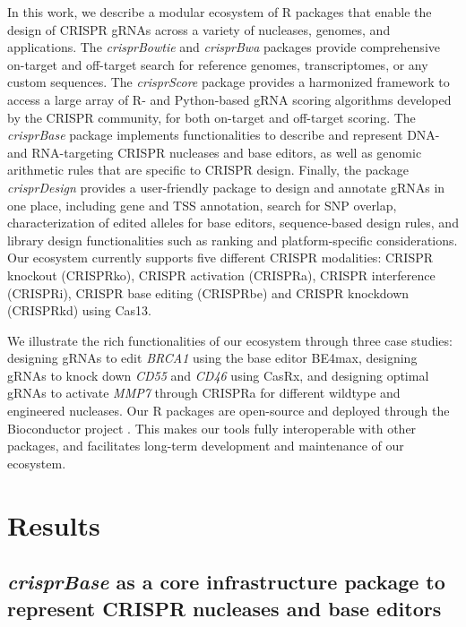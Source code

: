 \documentclass[pdftex,english,10pt]{article}
\begin{document}
In this work, we describe a modular ecosystem of R packages that enable the design of CRISPR gRNAs across a variety of nucleases, genomes, and applications.
The \textit{crisprBowtie} and \textit{crisprBwa} packages provide comprehensive on-target and off-target search for reference genomes, transcriptomes, or any custom sequences. The \textit{crisprScore} package provides a harmonized framework to access a large array of R- and Python-based gRNA scoring algorithms developed by the CRISPR community, for both on-target and off-target scoring. The \textit{crisprBase} package implements functionalities to describe and represent DNA- and RNA-targeting CRISPR  nucleases and base editors, as well as genomic arithmetic rules that are specific to CRISPR design. Finally, the package \textit{crisprDesign} provides a user-friendly package to design and annotate gRNAs in one place, including gene and TSS annotation, search for SNP overlap, characterization of edited alleles for base editors, sequence-based design rules, and library design functionalities such as ranking and platform-specific considerations. Our ecosystem currently supports five different CRISPR modalities: CRISPR knockout (CRISPRko), CRISPR activation (CRISPRa), CRISPR interference (CRISPRi), CRISPR base editing (CRISPRbe) and CRISPR knockdown (CRISPRkd) using Cas13.  


We illustrate the rich functionalities of our ecosystem through three case studies: designing gRNAs to edit \textit{BRCA1} using the base editor BE4max, designing gRNAs to knock down \textit{CD55} and \textit{CD46} using CasRx, and designing optimal gRNAs to activate \textit{MMP7} through CRISPRa for different wildtype and engineered nucleases. Our R packages are open-source and deployed through the Bioconductor project \citep{bioc1,bioc2}. This makes our tools fully interoperable with other packages, and facilitates long-term development and maintenance of our ecosystem. 





\section{Results}



\subsection{\textit{crisprBase} as a core infrastructure package to represent CRISPR nucleases and base editors}
\end{document}
